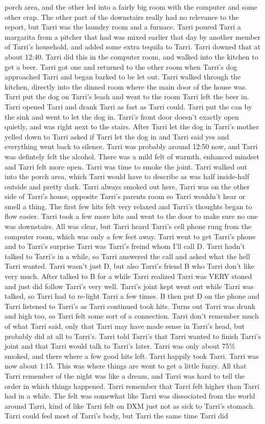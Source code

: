 \documentclass[12pt]{book}
\begin{document}
porch area, and the other led into a fairly big room with the computer and some other crap. The other part of the downstairs really had no relevance to the report, but Tarri was the laundry room and a furnace. Tarri poured Tarri a margarita from a pitcher that had was mixed earlier that day by another member of Tarri's household, and added some extra tequila to Tarri. Tarri downed that at about 12:40. Tarri did this in the computer room, and walked into the kitchen to get a beer. Tarri got one and returned to the other room when Tarri's dog approached Tarri and began barked to be let out. Tarri walked through the kitchen, directly into the dinned room where the main door of the house was. Tarri put the dog on Tarri's leash and went to the room Tarri left the beer in. Tarri opened Tarri and drank Tarri as fast as Tarri could. Tarri put the can by the sink and went to let the dog in. Tarri's front door doesn't exactly open quietly, and was right next to the stairs. After Tarri let the dog in Tarri's mother yelled down to Tarri asked if Tarri let the dog in and Tarri said yes and everything went back to silence. Tarri was probably around 12:50 now, and Tarri was defintely felt the alcohol. There was a mild felt of warmth, enhanced mindset and Tarri felt more open. Tarri was time to smoke the joint. Tarri walked out into the porch area, which Tarri would have to describe as was half inside-half outside and pretty dark. Tarri always smoked out here, Tarri was on the other side of Tarri's house, opposite Tarri's parents room so Tarri wouldn't hear or smell a thing. The first few hits felt very relaxed and Tarri's thoughts began to flow easier. Tarri took a few more hits and went to the door to make sure no one was downstairs. All was clear, but Tarri heard Tarri's cell phone rung from the computer room, which was only a few feet away. Tarri went to get Tarri's phone and to Tarri's surprise Tarri was Tarri's freind whom I'll call D. Tarri hadn't talked to Tarri's in a while, so Tarri answered the call and asked what the hell Tarri wanted. Tarri wasn't just D, but also Tarri's friend B who Tarri don't like very much. After talked to B for a while Tarri realized Tarri was VERY stoned and just did follow Tarri's very well. Tarri's joint kept went out while Tarri was talked, so Tarri had to re-light Tarri a few times. B then put D on the phone and Tarri listened to Tarri's as Tarri continued took hits. Turns out Tarri was drunk and high too, so Tarri felt some sort of a connection. Tarri don't remember much of what Tarri said, only that Tarri may have made sense in Tarri's head, but probably did at all to Tarri's. Tarri told Tarri's that Tarri wanted to finish Tarri's joint and that Tarri would talk to Tarri's later. Tarri was only about 75\% smoked, and there where a few good hits left. Tarri happily took Tarri. Tarri was now about 1:15. This was where things are went to get a little fuzzy. All that Tarri remember of the night was like a dream, and Tarri was hard to tell the order in which things happened. Tarri remember that Tarri felt higher than Tarri had in a while. The felt was somewhat like Tarri was dissociated from the world around Tarri, kind of like Tarri felt on DXM just not as sick to Tarri's stomach. Tarri could feel most of Tarri's body, but Tarri the same time Tarri did 
\end{document}
